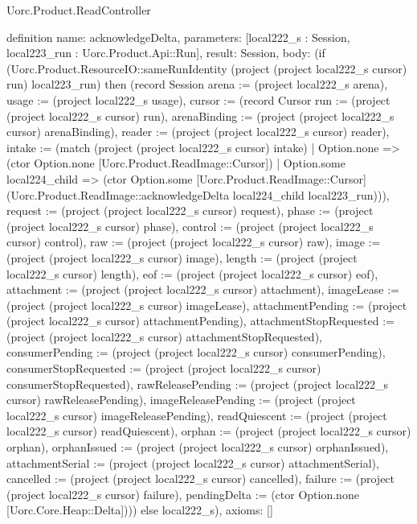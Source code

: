 \begin{lexlean}{Uorc.Product.ReadController}
\begin{semanticmodule}
definition{
  name: acknowledgeDelta,
  parameters: [local222_s : Session, local223_run : Uorc.Product.Api::Run],
  result: Session,
  body: (if (Uorc.Product.ResourceIO::sameRunIdentity (project (project local222_s cursor) run) local223_run) then (record Session {arena := (project local222_s arena), usage := (project local222_s usage), cursor := (record Cursor {run := (project (project local222_s cursor) run), arenaBinding := (project (project local222_s cursor) arenaBinding), reader := (project (project local222_s cursor) reader), intake := (match (project (project local222_s cursor) intake)
    | Option.none => (ctor Option.none [Uorc.Product.ReadImage::Cursor])
    | Option.some local224_child => (ctor Option.some [Uorc.Product.ReadImage::Cursor] (Uorc.Product.ReadImage::acknowledgeDelta local224_child local223_run))), request := (project (project local222_s cursor) request), phase := (project (project local222_s cursor) phase), control := (project (project local222_s cursor) control), raw := (project (project local222_s cursor) raw), image := (project (project local222_s cursor) image), length := (project (project local222_s cursor) length), eof := (project (project local222_s cursor) eof), attachment := (project (project local222_s cursor) attachment), imageLease := (project (project local222_s cursor) imageLease), attachmentPending := (project (project local222_s cursor) attachmentPending), attachmentStopRequested := (project (project local222_s cursor) attachmentStopRequested), consumerPending := (project (project local222_s cursor) consumerPending), consumerStopRequested := (project (project local222_s cursor) consumerStopRequested), rawReleasePending := (project (project local222_s cursor) rawReleasePending), imageReleasePending := (project (project local222_s cursor) imageReleasePending), readQuiescent := (project (project local222_s cursor) readQuiescent), orphan := (project (project local222_s cursor) orphan), orphanIssued := (project (project local222_s cursor) orphanIssued), attachmentSerial := (project (project local222_s cursor) attachmentSerial), cancelled := (project (project local222_s cursor) cancelled), failure := (project (project local222_s cursor) failure), pendingDelta := (ctor Option.none [Uorc.Core.Heap::Delta])})}) else local222_s),
  axioms: []
}


\end{semanticmodule}
\end{lexlean}
